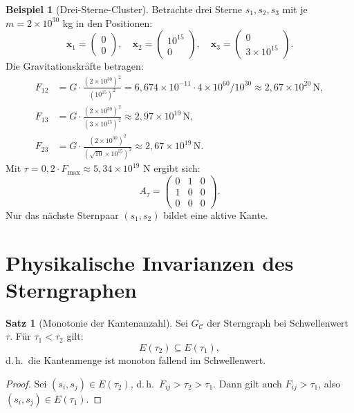 ﻿\documentclass[a4paper,12pt]{report}
\theoremstyle{definition}
\newtheorem{beispiel}{Beispiel}
\newtheorem{satz}{Satz}
\begin{document}
\begin{beispiel}[Drei-Sterne-Cluster]
Betrachte drei Sterne $s_1, s_2, s_3$ mit je $m = 2 \times 10^{30}$ kg in den Positionen:
\[
\mathbf{x}_1 = \begin{pmatrix}0\\0\end{pmatrix}, \quad
\mathbf{x}_2 = \begin{pmatrix}10^{15}\\0\end{pmatrix}, \quad
\mathbf{x}_3 = \begin{pmatrix}0\\3 \times 10^{15}\end{pmatrix}.
\]
Die Gravitationskräfte betragen:
\begin{align*}
F_{12} &= G \cdot \frac{(2 \times 10^{30})^2}{(10^{15})^2} = 6{,}674 \times 10^{-11} \cdot 4 \times 10^{60} / 10^{30} \approx 2{,}67 \times 10^{20} \, \mathrm{N}, \\
F_{13} &= G \cdot \frac{(2 \times 10^{30})^2}{(3 \times 10^{15})^2} \approx 2{,}97 \times 10^{19} \, \mathrm{N}, \\
F_{23} &= G \cdot \frac{(2 \times 10^{30})^2}{(\sqrt{10} \times 10^{15})^2} \approx 2{,}67 \times 10^{19} \, \mathrm{N}.
\end{align*}
Mit $\tau = 0{,}2 \cdot F_\mathrm{max} \approx 5{,}34 \times 10^{19}$ N ergibt sich:
\[
A_\tau = \begin{pmatrix}
    0 & 1 & 0 \\
    1 & 0 & 0 \\
    0 & 0 & 0
\end{pmatrix}.
\]
Nur das nächste Sternpaar $(s_1, s_2)$ bildet eine aktive Kante.
\end{beispiel}

\section{Physikalische Invarianzen des Sterngraphen}

\begin{satz}[Monotonie der Kantenanzahl]
\label{satz:monotonie}
Sei $G_\mathcal{C}$ der Sterngraph bei Schwellenwert $\tau$. Für $\tau_1 < \tau_2$ gilt:
\[
E(\tau_2) \subseteq E(\tau_1),
\]
d.\,h.\ die Kantenmenge ist monoton fallend im Schwellenwert.
\end{satz}

\begin{proof}
Sei $(s_i, s_j) \in E(\tau_2)$, d.\,h.\ $F_{ij} > \tau_2 > \tau_1$. Dann gilt auch $F_{ij} > \tau_1$, also $(s_i, s_j) \in E(\tau_1)$.
\end{proof}
\end{document}
